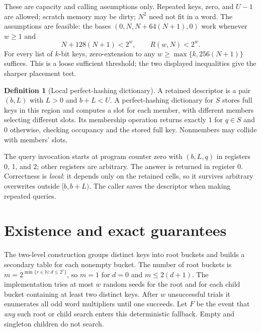 \documentclass[11pt,a4paper]{article}
\theoremstyle{definition}
\newtheorem{definition}{Definition}
\newcommand{\N}{\mathbb N}
\begin{document}
These are capacity and calling assumptions only. Repeated keys, zero, and
$U-1$ are allowed; scratch memory may be dirty; $N^2$ need not fit in a word.
The assumptions are feasible: the bases
$(0,N,N+64(N+1),0)$ work whenever $w\ge1$ and
\[
 N+128(N+1)<2^w,\qquad R(w,N)<2^w.
\]
For every list of $k$-bit keys, zero-extension to any
$w\ge\max\{k,256(N+1)\}$ suffices. This is a loose sufficient threshold;
the two displayed inequalities give the sharper placement test.

\begin{definition}[Local perfect-hashing dictionary]\label{def:dictionary}
A retained descriptor is a pair $(b,L)$ with $L>0$ and $b+L<U$.
A perfect-hashing dictionary for $S$ stores full keys in this region and
computes a slot for each member, with different members selecting different
slots. Its membership operation returns exactly $1$ for $q\in S$ and $0$
otherwise, checking occupancy and the stored full key. Nonmembers may collide
with members' slots.

The query invocation starts at program counter zero with $(b,L,q)$ in
registers 0, 1, and 2; other registers are arbitrary. The answer is returned
in register 0. Correctness is \emph{local}: it depends only on the retained
cells, so it survives arbitrary overwrites outside $[b,b+L)$.
The caller saves the descriptor when making repeated queries.
\end{definition}

\section{Existence and exact guarantees}

The two-level construction groups distinct keys into root buckets and
builds a secondary table for each nonempty bucket. The number of root buckets is
$m=2^{\min\{r\in\N:d\le2^r\}}$, so $m=1$ for $d=0$ and
$m\le2(d+1)$. The implementation tries at most $w$ random seeds for the
root and for each child bucket containing at least two distinct keys.
After $w$ unsuccessful trials it enumerates all odd word multipliers until
one succeeds. Let $F$ be the event that \emph{any} such root or child
search enters this deterministic fallback. Empty and singleton children
do not search.
\end{document}
